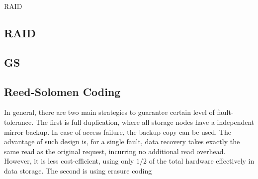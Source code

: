 RAID 

\subsection{RAID}

\subsection{GS}

\subsection{Reed-Solomen Coding}

In general, there are two main strategies to guarantee certain level of fault-tolerance. The first is full duplication, where all storage nodes have a independent mirror backup. In case of access failure, the backup copy can be used. The advantage of such design is, for a single fault, data recovery takes exactly the same read as the original request, incurring no additional read overhead. However, it is less cost-efficient, using only $1/2$ of the total hardware effectively in data storage. The second is using erasure coding